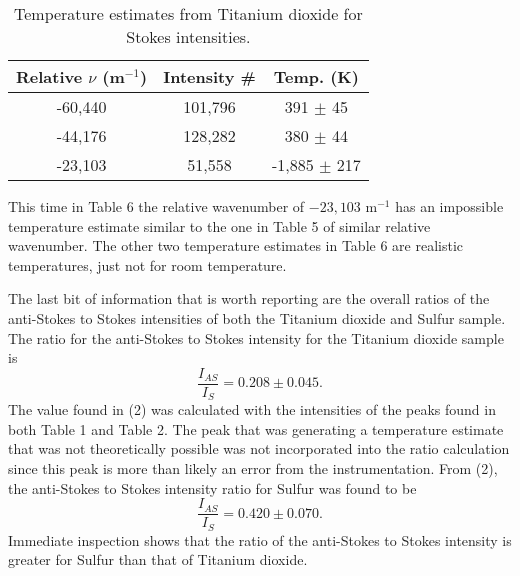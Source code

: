 \documentclass[twocolumn]{article}
\begin{document}
\begin{table}[htp]
\begin{center}
\begin{tabular}{|c|c|c|}
	\hline \textbf{Relative $\nu$ (m$^{-1}$)} & \textbf{Intensity \#} & \textbf{Temp. (K)} \\ \hline
	-60,440 & 101,796 & 391 $\pm$ 45 \\ \hline
	-44,176 & 128,282 & 380 $\pm$ 44 \\ \hline
	-23,103 & 51,558 & -1,885 $\pm$ 217 \\ \hline
\end{tabular}
\caption{Temperature estimates from Titanium dioxide for Stokes intensities.}
\end{center}
\label{default}
\end{table}%
\newline
This time in Table 6 the relative wavenumber of $-23,103$ m$^{-1}$ has an impossible temperature estimate similar to the one in Table 5 of similar relative wavenumber. The other two temperature estimates in Table 6 are realistic temperatures, just not for room temperature. 

The last bit of information that is worth reporting are the overall ratios of the anti-Stokes to Stokes intensities of both the Titanium dioxide and Sulfur sample. The ratio for the anti-Stokes to Stokes intensity for the Titanium dioxide sample is 
\begin{equation}\label{2}
	\frac{I_{AS}}{I_{S}}=0.208 \pm 0.045.
\end{equation}
The value found in (2) was calculated with the intensities of the peaks found in both Table 1 and Table 2. The peak that was generating a temperature estimate that was not theoretically possible was not incorporated into the ratio calculation since this peak is more than likely an error from the instrumentation. From (2), the anti-Stokes to Stokes intensity ratio for Sulfur was found to be
\begin{equation}
	\frac{I_{AS}}{I_{S}}=0.420 \pm 0.070.
\end{equation}
Immediate inspection shows that the ratio of the anti-Stokes to Stokes intensity is greater for Sulfur than that of Titanium dioxide.
\end{document}
